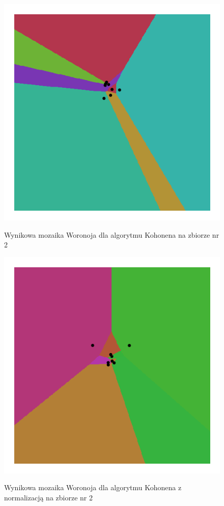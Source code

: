 \documentclass{classrep}
\begin{document}
\begin{figure}[h]
	\centering
		\includegraphics[scale=0.55]{pictures/kohonen_8_neuronow_zbior_1.png}
	\label{fig:kohonen_8_neuronow_zbior_1}
	\caption{Wynikowa mozaika Woronoja dla algorytmu Kohonena na zbiorze nr 2}
\end{figure}

\begin{figure}[h]
	\centering
		\includegraphics[scale=0.55]{pictures/kohonen_8_neuronow_zbior_1_normalized.png}
	\label{fig:kohonen_8_neuronow_zbior_1_normalized}
	\caption{Wynikowa mozaika Woronoja dla algorytmu Kohonena z normalizacją na zbiorze nr 2}
\end{figure}
\end{document}
